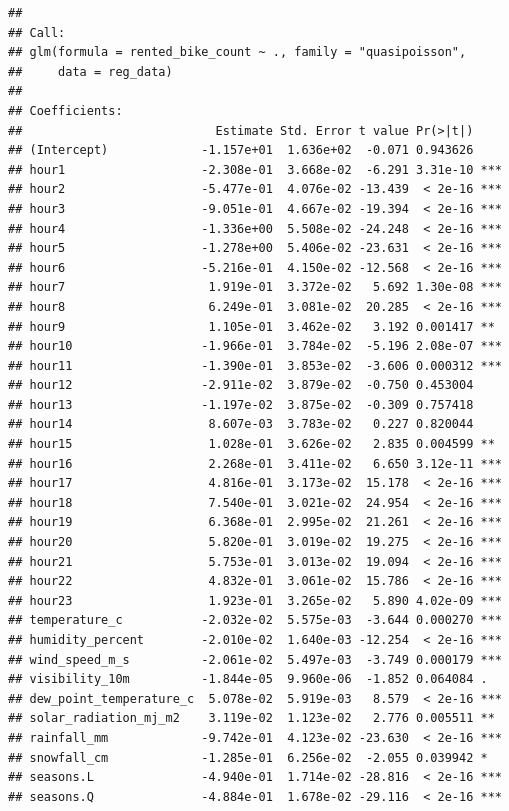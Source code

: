 \documentclass[
  11pt,
  letterpaper,
]{article}
\begin{document}
\begin{verbatim}
## 
## Call:
## glm(formula = rented_bike_count ~ ., family = "quasipoisson", 
##     data = reg_data)
## 
## Coefficients:
##                           Estimate Std. Error t value Pr(>|t|)    
## (Intercept)             -1.157e+01  1.636e+02  -0.071 0.943626    
## hour1                   -2.308e-01  3.668e-02  -6.291 3.31e-10 ***
## hour2                   -5.477e-01  4.076e-02 -13.439  < 2e-16 ***
## hour3                   -9.051e-01  4.667e-02 -19.394  < 2e-16 ***
## hour4                   -1.336e+00  5.508e-02 -24.248  < 2e-16 ***
## hour5                   -1.278e+00  5.406e-02 -23.631  < 2e-16 ***
## hour6                   -5.216e-01  4.150e-02 -12.568  < 2e-16 ***
## hour7                    1.919e-01  3.372e-02   5.692 1.30e-08 ***
## hour8                    6.249e-01  3.081e-02  20.285  < 2e-16 ***
## hour9                    1.105e-01  3.462e-02   3.192 0.001417 ** 
## hour10                  -1.966e-01  3.784e-02  -5.196 2.08e-07 ***
## hour11                  -1.390e-01  3.853e-02  -3.606 0.000312 ***
## hour12                  -2.911e-02  3.879e-02  -0.750 0.453004    
## hour13                  -1.197e-02  3.875e-02  -0.309 0.757418    
## hour14                   8.607e-03  3.783e-02   0.227 0.820044    
## hour15                   1.028e-01  3.626e-02   2.835 0.004599 ** 
## hour16                   2.268e-01  3.411e-02   6.650 3.12e-11 ***
## hour17                   4.816e-01  3.173e-02  15.178  < 2e-16 ***
## hour18                   7.540e-01  3.021e-02  24.954  < 2e-16 ***
## hour19                   6.368e-01  2.995e-02  21.261  < 2e-16 ***
## hour20                   5.820e-01  3.019e-02  19.275  < 2e-16 ***
## hour21                   5.753e-01  3.013e-02  19.094  < 2e-16 ***
## hour22                   4.832e-01  3.061e-02  15.786  < 2e-16 ***
## hour23                   1.923e-01  3.265e-02   5.890 4.02e-09 ***
## temperature_c           -2.032e-02  5.575e-03  -3.644 0.000270 ***
## humidity_percent        -2.010e-02  1.640e-03 -12.254  < 2e-16 ***
## wind_speed_m_s          -2.061e-02  5.497e-03  -3.749 0.000179 ***
## visibility_10m          -1.844e-05  9.960e-06  -1.852 0.064084 .  
## dew_point_temperature_c  5.078e-02  5.919e-03   8.579  < 2e-16 ***
## solar_radiation_mj_m2    3.119e-02  1.123e-02   2.776 0.005511 ** 
## rainfall_mm             -9.742e-01  4.123e-02 -23.630  < 2e-16 ***
## snowfall_cm             -1.285e-01  6.256e-02  -2.055 0.039942 *  
## seasons.L               -4.940e-01  1.714e-02 -28.816  < 2e-16 ***
## seasons.Q               -4.884e-01  1.678e-02 -29.116  < 2e-16 ***

\end{verbatim}
\end{document}
